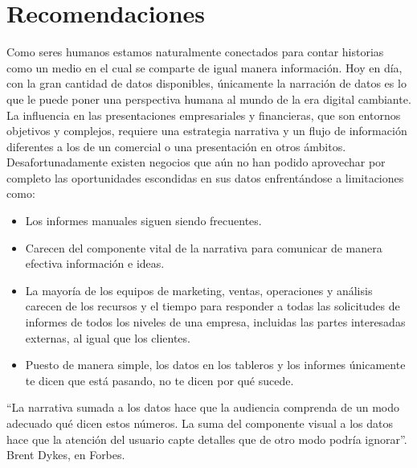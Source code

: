 \documentclass[twoside,twocolumn]{article}
\begin{document}
\section{Recomendaciones}
Como seres humanos estamos naturalmente conectados para contar historias como un medio en el cual se comparte de igual manera información. Hoy en día, con la gran cantidad de datos disponibles, únicamente la narración de datos es lo que le puede poner una perspectiva humana al mundo de la era digital cambiante. La influencia en las presentaciones empresariales y financieras, que son entornos objetivos y complejos, requiere una estrategia narrativa y un flujo de información diferentes a los de un comercial o una presentación en otros ámbitos.
Desafortunadamente existen negocios que aún no han podido aprovechar por completo las oportunidades escondidas en sus datos enfrentándose a limitaciones como:
\begin{itemize}
    \item Los informes manuales siguen siendo frecuentes. 
    \item Carecen del componente vital de la narrativa para comunicar de manera efectiva información e ideas.
    \item La mayoría de los equipos de marketing, ventas, operaciones y análisis carecen de los recursos y el tiempo para responder a todas las solicitudes de informes de todos los niveles de una empresa, incluidas las partes interesadas externas, al igual que los clientes.
    \item Puesto de manera simple, los datos en los tableros y los informes únicamente te dicen que está pasando, no te dicen por qué sucede.
\end{itemize}
“La narrativa sumada a los datos hace que la audiencia comprenda de un modo adecuado qué dicen estos números. La suma del componente visual a los datos hace que la atención del usuario capte detalles que de otro modo podría ignorar”. Brent Dykes, en Forbes.



\end{document}
